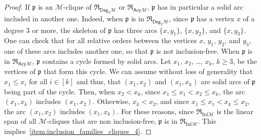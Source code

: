 \documentclass[10pt,reqno]{amsart}
\numberwithin{equation}{subsection}
\renewcommand{\leq}{\leqslant}
\renewcommand{\geq}{\geqslant}
\newcommand{\Mca}{\mathcal{M}}
\newcommand{\Pfr}{\mathfrak{p}}
\newcommand{\Deg}{\mathsf{Deg}}
\newcommand{\Acy}{\mathsf{Acy}}
\newcommand{\Inf}{\mathrm{Inf}}
\newcommand{\Rel}{\mathfrak{R}}
\begin{document}
\begin{proof}
    If $\Pfr$ is an $\Mca$-clique of $\Rel_{\Deg_2\Mca}$ or
    $\Rel_{\Acy\Mca}$, $\Pfr$ has in particular a solid arc included in
    another one. Indeed, when $\Pfr$ is in $\Rel_{\Deg_2\Mca}$, since
    $\Pfr$ has a vertex $x$ of a degree $3$ or more, the skeleton
    of $\Pfr$ has three arcs $\{x, y_1\}$, $\{x, y_2\}$, and
    $\{x, y_3\}$. One can check that for all relative orders between
    the vertices $x$, $y_1$, $y_2$, and $y_3$, one of these arcs
    includes another one, so that $\Pfr$ is not inclusion-free. When
    $\Pfr$ is in $\Rel_{\Acy\Mca}$, $\Pfr$ contains a cycle formed by
    solid arcs. Let $x_1$, $x_2$, \dots, $x_k$, $k \geq 3$, be the
    vertices of $\Pfr$ that form this cycle. We can assume without loss
    of generality that $x_1 \leq x_i$ for all $i \in [k]$ and thus, that
    $(x_1, x_2)$ and $(x_1, x_k)$ are solid arcs of $\Pfr$ being part of
    the cycle. Then, when $x_2 < x_k$, since
    $x_1 \leq x_1 < x_2 \leq x_k$, the arc $(x_1, x_k)$ includes
    $(x_1, x_2)$. Otherwise, $x_k < x_2$, and since
    $x_1 \leq x_1 < x_k \leq x_2$, the arc $(x_1, x_2)$ includes
    $(x_1, x_k)$. For these reasons, since $\Rel_{\Inf\Mca}$ is the
    linear span of all $\Mca$-cliques that are non inclusion-free,
    $\Pfr$ is in $\Rel_{\Inf\Mca}$. This
    implies~\ref{item:inclusion_families_cliques_4}.
\end{proof}
\medskip

\end{document}
